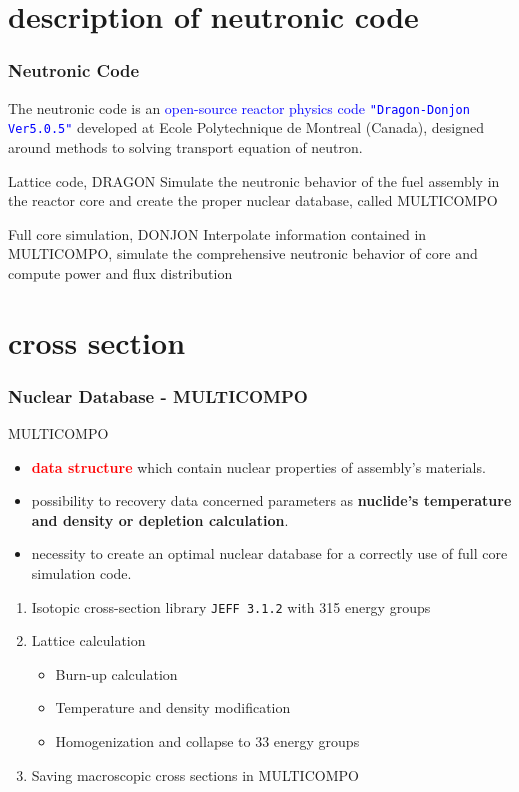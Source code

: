 \documentclass[10pt]{beamer}
\theoremstyle{definition}
\begin{document}
\section{description of neutronic code}
\begin{frame}[t]
\frametitle{Neutronic Code}
The neutronic code is an \textcolor{blue}{open-source reactor physics code \texttt{"Dragon-Donjon Ver5.0.5"}} developed at Ecole Polytechnique de Montreal (Canada), designed around methods to solving transport equation of neutron.
\begin{block}{Lattice code, DRAGON}
Simulate the neutronic behavior of the fuel assembly in the reactor core and create the proper nuclear database, called MULTICOMPO
\end{block}
\begin{block}{Full core simulation, DONJON}
Interpolate information contained in MULTICOMPO, simulate the comprehensive neutronic behavior of core and compute power and flux distribution
\end{block}
\end{frame}

\section{cross section}
\begin{frame}[t]
\frametitle{Nuclear Database - MULTICOMPO}
\begin{block}{MULTICOMPO}
\begin{itemize}

\item \textcolor{red}{\textbf{data structure}} which contain nuclear properties of assembly's materials.

\item possibility to recovery data concerned parameters as \textcolor{mygreen}{\textbf{nuclide's temperature and density or depletion calculation}}. 

\item necessity to create an optimal nuclear database for a correctly use of full core simulation code.

\end{itemize}
\end{block}
\begin{block}

\begin{enumerate}
\item Isotopic cross-section library \texttt{JEFF 3.1.2} with 315 energy groups
\item Lattice calculation
\begin{itemize}
\item Burn-up calculation
\item Temperature and density modification
\item Homogenization and collapse to 33 energy groups
\end{itemize}
\item Saving macroscopic cross sections in MULTICOMPO
\end{enumerate}

\end{block}

\end{frame}
\end{document}
